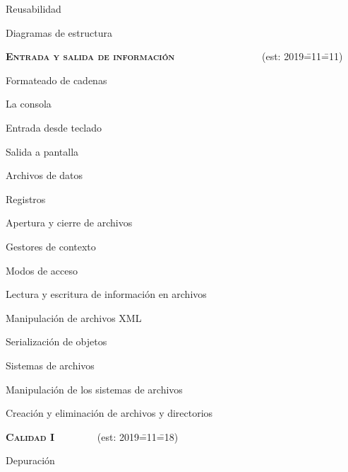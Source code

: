 \begin{longenum}
\begin{longenum}
\begin{longenum}
\begin{longenum}
            \end{longenum}
            \item Reusabilidad
        \end{longenum}
        \item Diagramas de estructura
    \end{longenum}
    \item \textbf{\textsc{Entrada y salida de información}} \ \ \ \ \ \ \ \ \ \ \ \ \ \ \ \ \ (est: 2019\==11\==11)
    \begin{longenum}
        \item Formateado de cadenas
        \item La consola
        \begin{longenum}
            \item Entrada desde teclado
            \item Salida a pantalla
        \end{longenum}
        \item Archivos de datos
        \begin{longenum}
            \item Registros
            \item Apertura y cierre de archivos
            \item Gestores de contexto
            \item Modos de acceso
            \item Lectura y escritura de información en archivos
        \end{longenum}
        \item Manipulación de archivos XML
        \item Serialización de objetos
        \item Sistemas de archivos
        \begin{longenum}
            \item Manipulación de los sistemas de archivos
            \item Creación y eliminación de archivos y directorios
        \end{longenum}
    \end{longenum}
    \item \textbf{\textsc{Calidad I}} \ \ \ \ \ \ \ \ (est: 2019\==11\==18)
    \begin{longenum}
        \item Depuración

\end{longenum}
\end{longenum}
